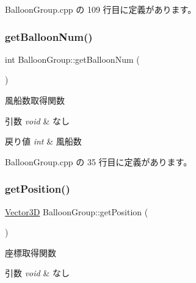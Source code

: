  Balloon\+Group.\+cpp の 109 行目に定義があります。

\mbox{\label{class_balloon_group_acb54ba4e3355015eb24a2090c87e209f}} 
\subsubsection{\texorpdfstring{get\+Balloon\+Num()}{getBalloonNum()}}
{\footnotesize\ttfamily int Balloon\+Group\+::get\+Balloon\+Num (\begin{DoxyParamCaption}{ }\end{DoxyParamCaption})}



風船数取得関数 


\begin{DoxyParams}{引数}
{\em void} & なし \\
\hline
\end{DoxyParams}

\begin{DoxyRetVals}{戻り値}
{\em int} & 風船数 \\
\hline
\end{DoxyRetVals}


 Balloon\+Group.\+cpp の 35 行目に定義があります。

\mbox{\label{class_balloon_group_ac0ffe27fcf8966d7017fd8f0c3efc7d7}} 
\subsubsection{\texorpdfstring{get\+Position()}{getPosition()}}
{\footnotesize\ttfamily \mbox{\hyperlink{class_vector3_d}{Vector3D}} Balloon\+Group\+::get\+Position (\begin{DoxyParamCaption}{ }\end{DoxyParamCaption})}



座標取得関数 


\begin{DoxyParams}{引数}
{\em void} & なし \\
\hline
\end{DoxyParams}

